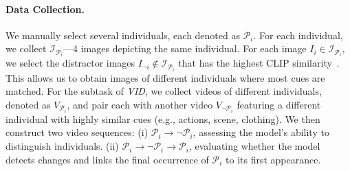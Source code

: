 \paragraph{Data Collection.}  
We manually select several individuals, each denoted as \( \mathcal{P}_i \). For each individual, we collect \( \mathcal{I}_{\mathcal{P}_i}\)—4 images depicting the same individual. For each image \( I_i  \in  \mathcal{I}_{\mathcal{P}_i} \), we select the distractor images \( I_{\neg i} \notin \mathcal{I}_{\mathcal{P}_i} \) that has the highest CLIP similarity~\citep{hessel2021clipscore}. This allows us to obtain images of different individuals where most cues are matched.
For the subtask of \textit{VID}, we collect videos of different individuals, denoted as \( V_{\mathcal{P}_i} \), and pair each with another video \( V_{\neg \mathcal{P}_i} \) featuring a different individual with highly similar cues (e.g., actions, scene, clothing). We then construct two video sequences: 
(i) \( \mathcal{P}_i \xrightarrow{} \neg \mathcal{P}_i \), assessing the model's ability to distinguish individuals. 
(ii) \( \mathcal{P}_i \xrightarrow{} \neg \mathcal{P}_i \xrightarrow{} \mathcal{P}_i \), evaluating whether the model detects changes and links the final occurrence of \( \mathcal{P}_i \) to its first appearance.




